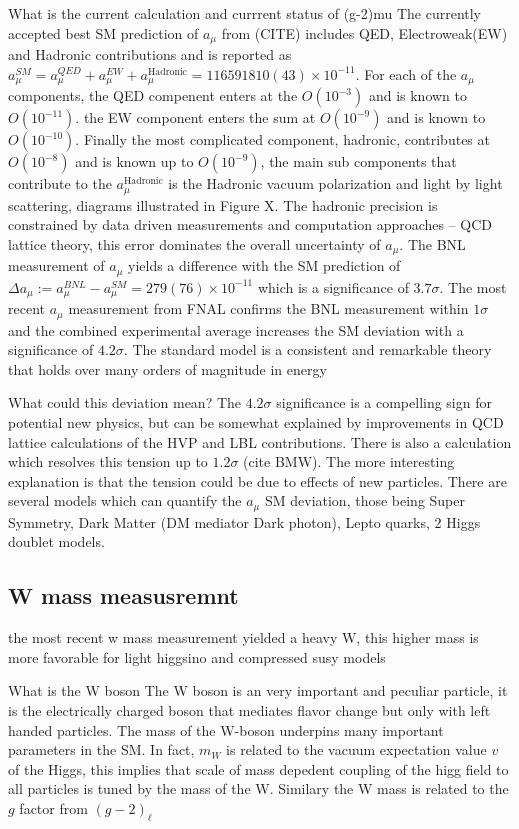 What is the current calculation and currrent status of (g-2)mu
The currently accepted best SM prediction of $a_\mu$ from (CITE) includes QED, Electroweak(EW) and Hadronic contributions and is reported as $a_\mu^{SM} = a_\mu^{QED}+ a_\mu^{EW}+a_\mu^{\text{Hadronic}} = 116 591 810(43) \times 10^{-11}$. For each of the $a_\mu$ components, the QED compenent enters at the $O(10^{-3})$ and is known to $O(10^{-11})$. the EW component enters the sum at $O(10^{-9})$ and is known to $O(10^{-10})$. Finally the most complicated component, hadronic, contributes at $O(10^{-8})$ and is known up to $O(10^{-9})$, the  main sub components that contribute to the $a_\mu^{\text{Hadronic}}$ is the Hadronic vacuum polarization and light by light scattering, diagrams illustrated in Figure X. The hadronic precision is constrained by data driven measurements and computation approaches -- QCD lattice theory, this error dominates the overall uncertainty of $a_\mu$. The BNL measurement of $a_\mu$ yields a difference with the SM prediction of $\Delta a_\mu := a_\mu^{BNL} - a_\mu^{SM} = 279(76) \times 10^{-11}$ which is a significance of $3.7\sigma$. The most recent $a_\mu$ measurement from FNAL confirms the BNL measurement within $1\sigma$ and the combined experimental average increases the SM deviation with a significance of $4.2\sigma$.
The standard model is a consistent and remarkable theory that holds over many orders of magnitude in energy

What could this deviation mean?
The $4.2\sigma$ significance is a compelling sign for potential new physics, but can be somewhat explained by improvements in QCD lattice calculations of the HVP and LBL contributions. There is also a calculation which resolves this tension up to $1.2\sigma$ (cite BMW). The more interesting explanation is that the tension could be due to effects of new particles. There are several models which can quantify the $a_\mu$ SM deviation, those being Super Symmetry, Dark Matter (DM mediator Dark photon), Lepto quarks, 2 Higgs doublet models.



\subsection{W mass measusremnt}
the most recent w mass measurement yielded a heavy W, this higher mass is more favorable for light higgsino and compressed susy models

What is the W boson
The W boson is an very important and peculiar particle, it is the electrically charged boson that mediates flavor change but only with left handed particles.  The mass of the W-boson underpins many important parameters in the SM. In fact, $m_W$ is related to the vacuum expectation value $v$ of the Higgs, this implies that scale of mass depedent coupling of the higg field to all particles is tuned by the mass of the W. Similary the W mass is related to the $g$ factor from $(g-2)_\ell$ 

